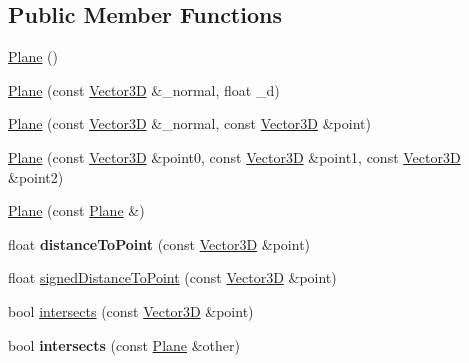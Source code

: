 \subsection*{Public Member Functions}
\begin{DoxyCompactItemize}
\item 
\hyperlink{classdrider_s_d_k_1_1_plane_a57f51d0d638c01f39ccf0ae6ff8fa2c0}{Plane} ()
\item 
\hyperlink{classdrider_s_d_k_1_1_plane_adef490d98a9ef2feda51c5b9e499aa50}{Plane} (const \hyperlink{classdrider_s_d_k_1_1_vector3_d}{Vector3D} \&\+\_\+normal, float \+\_\+d)
\item 
\hyperlink{classdrider_s_d_k_1_1_plane_a0560ff07d9e3b04b983a007f18470e23}{Plane} (const \hyperlink{classdrider_s_d_k_1_1_vector3_d}{Vector3D} \&\+\_\+normal, const \hyperlink{classdrider_s_d_k_1_1_vector3_d}{Vector3D} \&point)
\item 
\hyperlink{classdrider_s_d_k_1_1_plane_a4348d4b3f619cda528aa2512d6854538}{Plane} (const \hyperlink{classdrider_s_d_k_1_1_vector3_d}{Vector3D} \&point0, const \hyperlink{classdrider_s_d_k_1_1_vector3_d}{Vector3D} \&point1, const \hyperlink{classdrider_s_d_k_1_1_vector3_d}{Vector3D} \&point2)
\item 
\hyperlink{classdrider_s_d_k_1_1_plane_a8252aebcd126e8fe5b904513db658575}{Plane} (const \hyperlink{classdrider_s_d_k_1_1_plane}{Plane} \&)
\item 
\mbox{\label{classdrider_s_d_k_1_1_plane_abf5cc0a71fae706c0d36d86d366963a0}} 
float {\bfseries distance\+To\+Point} (const \hyperlink{classdrider_s_d_k_1_1_vector3_d}{Vector3D} \&point)
\item 
float \hyperlink{classdrider_s_d_k_1_1_plane_a289ac3afd02981e3a1921846d9b14589}{signed\+Distance\+To\+Point} (const \hyperlink{classdrider_s_d_k_1_1_vector3_d}{Vector3D} \&point)
\item 
bool \hyperlink{classdrider_s_d_k_1_1_plane_a1dbd209dd564674cc1a4065fd089e3b2}{intersects} (const \hyperlink{classdrider_s_d_k_1_1_vector3_d}{Vector3D} \&point)
\item 
\mbox{\label{classdrider_s_d_k_1_1_plane_a04f70d65529a37a11ea78e9dc18354ca}} 
bool {\bfseries intersects} (const \hyperlink{classdrider_s_d_k_1_1_plane}{Plane} \&other)
\item 
\mbox{\label{classdrider_s_d_k_1_1_plane_aa24c91225bc02094376ade5569af7d57}} 

\end{DoxyCompactItemize}
